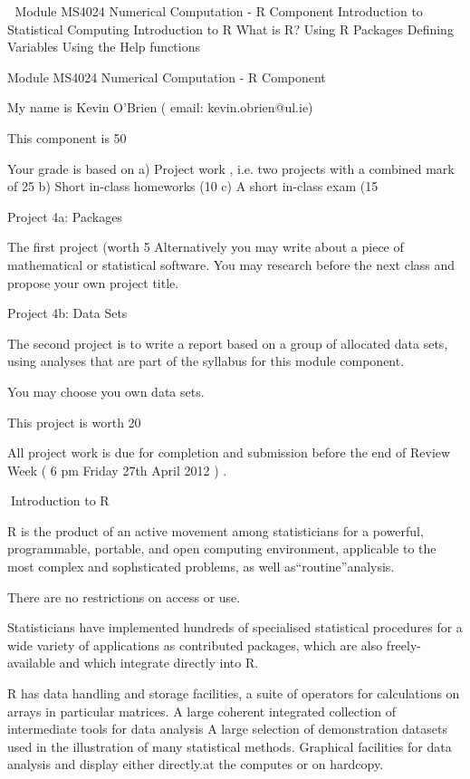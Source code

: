 


Module MS4024 Numerical Computation - R Component
Introduction to Statistical Computing
Introduction to R
What is R?
Using R
Packages
Defining Variables
Using the Help functions

Module MS4024 Numerical Computation - R Component

My name is Kevin O'Brien ( email: kevin.obrien@ul.ie)

This component is 50%

Your grade is based on 
a) Project work , i.e. two projects with a combined mark of 25%
b) Short in-class homeworks (10%
c) A short in-class exam (15%

Project 4a: Packages

The first project  (worth 5%
Alternatively you may write about a piece of mathematical
or statistical software. You may research before the next class and propose your own project title. 

Project 4b: Data Sets

The second project is to write a report based on a group of allocated data sets, using analyses that are part of the syllabus for this module component. 

You may choose you own data sets.  

This project is worth 20%

All project work is due for completion and submission before the end of Review Week ( 6 pm Friday 27th April 2012 ) .

Introduction to R

R is the product of an active movement among statisticians for a powerful, programmable, portable, and open computing environment, applicable to the most complex and sophsticated problems, as well as“routine”analysis.
 
There are no restrictions on access or use.


Statisticians have implemented hundreds of specialised statistical procedures for a wide variety of applications as contributed packages, which are also freely-available and which integrate directly into R.

 
R has data handling and storage facilities, a suite of operators for calculations on arrays in particular matrices. A large coherent integrated collection of intermediate tools for data analysis
A large selection of demonstration datasets used in the illustration of many statistical methods.
Graphical facilities for data analysis and display either directly.at the computes or on hardcopy.
 

